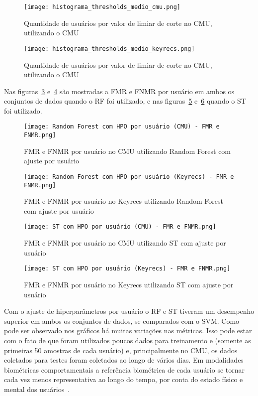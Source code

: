 \begin{figure}[htbp]
    \centering
    \texttt{[image: histograma\_thresholds\_medio\_cmu.png]}
    \caption{Quantidade de usuários por valor de limiar de corte no CMU, utilizando o CMU}\label{fig:st_t_hist_cmu}
\end{figure}

\begin{figure}[htbp]
    \centering
    \texttt{[image: histograma\_thresholds\_medio\_keyrecs.png]}
    \caption{Quantidade de usuários por valor de limiar de corte no CMU, utilizando o CMU}\label{fig:st_t_hist_keyrecs}
\end{figure}

Nas figuras~\ref{fig:rf_hpo_user_cmu} e~\ref{fig:rf_hpo_user_keyrecs} são mostradas a FMR e FNMR por usuário em ambos os conjuntos de dados quando o RF foi utilizado, e nas figuras~\ref{fig:st_hpo_user_cmu} e~\ref{fig:st_hpo_user_keyrecs} quando o ST foi utilizado.

\begin{figure}[htbp]
    \centering
    \texttt{[image: Random Forest com HPO por usuário (CMU) - FMR e FNMR.png]}
    \caption{FMR e FNMR por usuário no CMU utilizando Random Forest com ajuste por usuário}\label{fig:rf_hpo_user_cmu}
\end{figure}

\begin{figure}[htbp]
    \centering
    \texttt{[image: Random Forest com HPO por usuário (Keyrecs) - FMR e FNMR.png]}
    \caption{FMR e FNMR por usuário no Keyrecs utilizando Random Forest com ajuste por usuário}\label{fig:rf_hpo_user_keyrecs}
\end{figure}

\begin{figure}[htbp]
    \centering
    \texttt{[image: ST com HPO por usuário (CMU) - FMR e FNMR.png]}
    \caption{FMR e FNMR por usuário no CMU utilizando ST com ajuste por usuário}\label{fig:st_hpo_user_cmu}
\end{figure}

\begin{figure}[htbp]
    \centering
    \texttt{[image: ST com HPO por usuário (Keyrecs) - FMR e FNMR.png]}
    \caption{FMR e FNMR por usuário no Keyrecs utilizando ST com ajuste por usuário}\label{fig:st_hpo_user_keyrecs}
\end{figure}

Com o ajuste de hiperparâmetros por usuário o RF e ST tiveram um desempenho superior em ambos os conjuntos de dados, se comparados com o SVM. Como pode ser observado nos gráficos há muitas variações nas métricas. Isso pode estar com o fato de que foram utilizados poucos dados para treinamento e (somente as primeiras 50 amostras de cada usuário) e, principalmente no CMU, os dados coletados para testes foram coletados ao longo de vários dias. Em modalidades biométricas comportamentais a referência biométrica de cada usuário se tornar cada vez menos representativa ao longo do tempo, por conta do estado físico e mental dos usuários~\cite{keystroke_template_update_with_adapted_thresholds}.